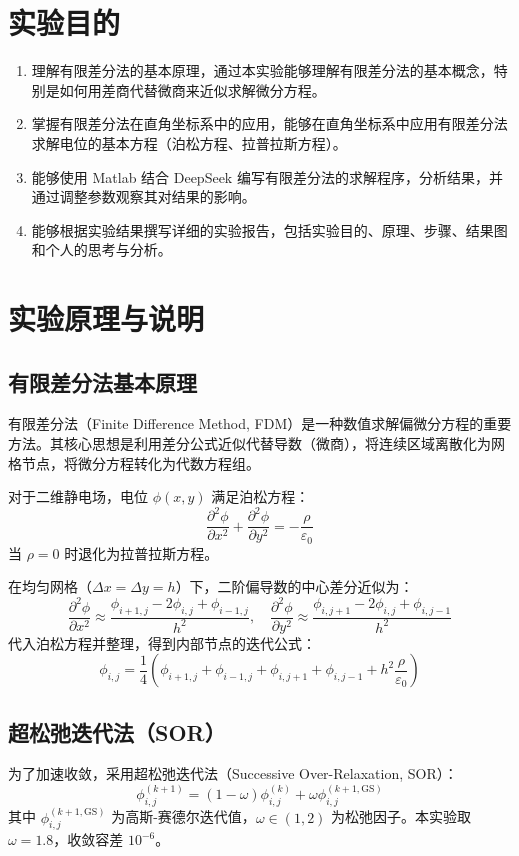 \documentclass{../ElectromagneticFieldTemplate}
\begin{document}
\maketitle

\section{实验目的}

\begin{enumerate}
    \item 理解有限差分法的基本原理，通过本实验能够理解有限差分法的基本概念，特别是如何用差商代替微商来近似求解微分方程。
    \item 掌握有限差分法在直角坐标系中的应用，能够在直角坐标系中应用有限差分法求解电位的基本方程（泊松方程、拉普拉斯方程）。
    \item 能够使用 Matlab 结合 DeepSeek 编写有限差分法的求解程序，分析结果，并通过调整参数观察其对结果的影响。
    \item 能够根据实验结果撰写详细的实验报告，包括实验目的、原理、步骤、结果图和个人的思考与分析。
\end{enumerate}

\section{实验原理与说明}

\subsection{有限差分法基本原理}
有限差分法（Finite Difference Method, FDM）是一种数值求解偏微分方程的重要方法。其核心思想是利用差分公式近似代替导数（微商），将连续区域离散化为网格节点，将微分方程转化为代数方程组。

对于二维静电场，电位 \(\phi(x,y)\) 满足泊松方程：
\[
\frac{\partial^2 \phi}{\partial x^2} + \frac{\partial^2 \phi}{\partial y^2} = -\frac{\rho}{\varepsilon_0}
\]
当 \(\rho=0\) 时退化为拉普拉斯方程。

在均匀网格（\(\Delta x = \Delta y = h\)）下，二阶偏导数的中心差分近似为：
\[
\frac{\partial^2 \phi}{\partial x^2} \approx \frac{\phi_{i+1,j} - 2\phi_{i,j} + \phi_{i-1,j}}{h^2}, \quad
\frac{\partial^2 \phi}{\partial y^2} \approx \frac{\phi_{i,j+1} - 2\phi_{i,j} + \phi_{i,j-1}}{h^2}
\]
代入泊松方程并整理，得到内部节点的迭代公式：
\[
\phi_{i,j} = \frac{1}{4}\left( \phi_{i+1,j} + \phi_{i-1,j} + \phi_{i,j+1} + \phi_{i,j-1} + h^2 \frac{\rho}{\varepsilon_0} \right)
\]

\subsection{超松弛迭代法（SOR）}
为了加速收敛，采用超松弛迭代法（Successive Over-Relaxation, SOR）：
\[
\phi_{i,j}^{(k+1)} = (1-\omega)\phi_{i,j}^{(k)} + \omega \phi_{i,j}^{(k+1,\text{GS})}
\]
其中 \(\phi_{i,j}^{(k+1,\text{GS})}\) 为高斯-赛德尔迭代值，\(\omega \in (1,2)\) 为松弛因子。本实验取 \(\omega=1.8\)，收敛容差 \(10^{-6}\)。
\end{document}
